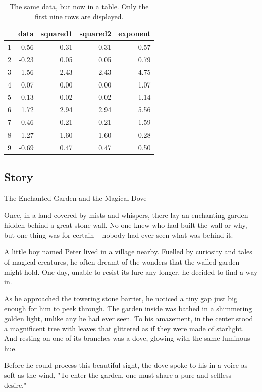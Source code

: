 \documentclass[10pt, fullpage, a4paper, titlepage]{article}
\begin{document}
\begin{table}[ht]
\caption{The same data, but now in a table. Only the first nine rows are displayed.}
\centering
\begin{tabular}{rrrrr}
  \hline
 & data & squared1 & squared2 & exponent \\ 
  \hline
1 & -0.56 & 0.31 & 0.31 & 0.57 \\ 
  2 & -0.23 & 0.05 & 0.05 & 0.79 \\ 
  3 & 1.56 & 2.43 & 2.43 & 4.75 \\ 
  4 & 0.07 & 0.00 & 0.00 & 1.07 \\ 
  5 & 0.13 & 0.02 & 0.02 & 1.14 \\ 
  6 & 1.72 & 2.94 & 2.94 & 5.56 \\ 
  7 & 0.46 & 0.21 & 0.21 & 1.59 \\ 
  8 & -1.27 & 1.60 & 1.60 & 0.28 \\ 
  9 & -0.69 & 0.47 & 0.47 & 0.50 \\ 
   \hline
\end{tabular}
\end{table}
\subsection{Story}
The Enchanted Garden and the Magical Dove\

Once, in a land covered by mists and whispers, there lay an enchanting garden hidden behind a great stone wall. No one knew who had built the wall or why, but one thing was for certain – nobody had ever seen what was behind it.\

A little boy named Peter lived in a village nearby. Fuelled by curiosity and tales of magical creatures, he often dreamt of the wonders that the walled garden might hold. One day, unable to resist its lure any longer, he decided to find a way in.\

As he approached the towering stone barrier, he noticed a tiny gap just big enough for him to peek through. The garden inside was bathed in a shimmering golden light, unlike any he had ever seen. To his amazement, in the center stood a magnificent tree with leaves that glittered as if they were made of starlight. And resting on one of its branches was a dove, glowing with the same luminous hue.\

Before he could process this beautiful sight, the dove spoke to his in a voice as soft as the wind, "To enter the garden, one must share a pure and selfless desire."\
\end{document}
